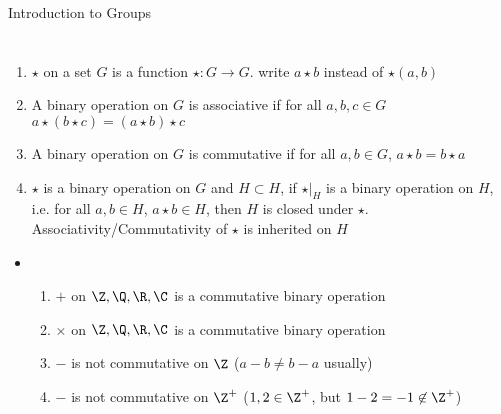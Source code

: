 \documentclass[11pt]{article}
\begin{document}
\begin{center}
    {\Huge Introduction to Groups}
\end{center}
\tableofcontents
\newpage


\section{}


\begin{definition*} 
    \begin{enumerate}
        \item {} $\star$ on a set $G$ is a function $\star:G\to G$. write $a\star b$ instead of $\star(a,b)$
        \item {} A binary operation on $G$ is associative if for all $a,b,c\in G$ $a\star (b\star c) = (a\star b) \star c$
        \item {} A binary operation on $G$ is commutative if for all $a,b\in G$, $a\star b = b\star a$
        \item {} $\star$ is a binary operation on $G$ and $H\subset H$, if $\star|_H$ is a binary operation on $H$, i.e. for all $a,b\in H$, $a\star b \in H$, then $H$ is closed under $\star$. Associativity/Commutativity of $\star$ is inherited on $H$
    \end{enumerate}
    \begin{itemize}
        \item {}
        \begin{enumerate}
            \item $+$ on $\Z,\Q,\R,\C$ is a commutative binary operation
            \item $\times$ on $\Z,\Q,\R,\C$ is a commutative binary operation
            \item $-$ is not commutative on $\Z$ ($a-b \neq b-a$ usually)
            \item $-$ is not commutative on $\Z^+$ ($1,2\in\Z^+$, but $1-2 = -1 \not\in \Z^+$)
        \end{enumerate}
    \end{itemize}
\end{definition*}
\end{document}
